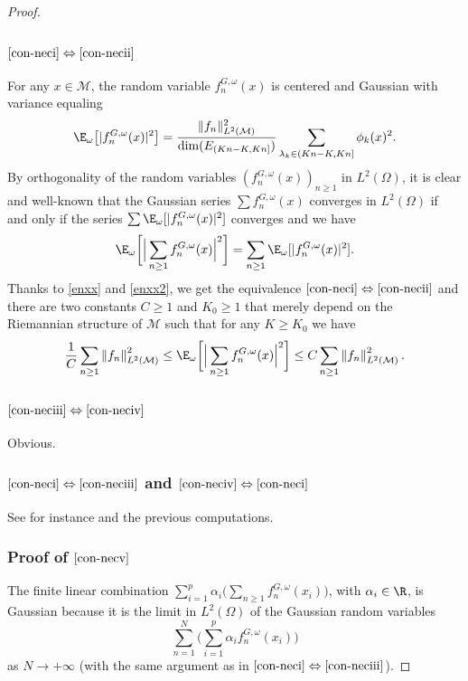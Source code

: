 \skpt
\begin{proof}\vspace*{-5pt}
\subsubsection*{$\eqref{con-neci}\Leftrightarrow\eqref{con-necii}$}
For any $x\in \mathcal{M}$, the random variable $f_n^{G,\omega}(x)$ is centered and Gaussian with
variance equaling
\begin{equation*}
\E_{\omega}\bigl[|f_n^{G,\omega}(x)|^2\bigr]=\frac{\|f_n\|_{L^2(\mathcal{M})}^2}{\dim(E_{(Kn-K,Kn]})}\sum_{\lambda_k\in (Kn-K,Kn]} \phi_k(x)^2.
\end{equation*}
By orthogonality of the random variables $(f_n^{G,\omega}(x))_{n\geq 1}$ in $L^2(\Omega)$, it is clear and well-known that the Gaussian series $\sum f_n^{G,\omega}(x)$ converges in $L^2(\Omega)$ if and only if the series $\sum \E_{\omega}[|f_n^{G,\omega}(x)|^2]$ converges and we have
\begin{equation*}
\E_{\omega}\biggl[\Big| \sum_{n\geq 1}f_n^{G,\omega}(x) \Big|^2 \biggr]=\sum_{n\geq 1} \E_{\omega}[|f_n^{G,\omega}(x)|^2].
\end{equation*}
Thanks to \eqref{enxx} and \eqref{enxx2}, we get the equivalence $\eqref{con-neci}\Leftrightarrow\eqref{con-necii}$ and
there are two constants $C\geq 1$ and $K_0\geq 1$ that merely depend on the Riemannian structure of $\mathcal{M}$ such that for any $K\geq K_0$ we have
\begin{equation}\label{gaau2}
\frac{1}{C}\sum_{n\geq 1} \left\Vert f_n\right\Vert_{L^2(\mathcal{M})}^2\leq \E_{\omega}
\biggl[\Big|\sum_{n\geq 1} f_n^{G,\omega}(x) \Big|^2 \biggr]
\leq C \sum_{n\geq 1} \left\Vert f_n\right\Vert_{L^2(\mathcal{M})}^2.
\end{equation}

\subsubsection*{$\eqref{con-neciii}\Leftrightarrow\eqref{con-neciv}$}
Obvious.

\subsubsection*{$\eqref{con-neci}\Leftrightarrow\eqref{con-neciii}$ and $\eqref{con-neciv}\Leftrightarrow\eqref{con-neci}$} See for instance \cite[Cor.\,III.6, p.\,26]{queff2} and the previous computations.

\subsubsection*{Proof of $\eqref{con-necv}$} The finite linear combination $\sum_{i=1}^{p} \alpha_i \bigl(\sum_{n\geq 1}f_n^{G,\omega}(x_i)\bigr)$, with $\alpha_i\in \R$, is Gaussian because it is the limit in $L^2(\Omega)$ of the Gaussian random variables
\begin{equation*}
\sum_{n=1}^N \biggl(\sum_{i=1}^p \alpha_i f_n^{G,\omega}(x_i) \biggr)
\end{equation*} as $N\to +\infty$ (with the same argument as in $\eqref{con-neci}\Leftrightarrow\eqref{con-neciii}$).


\end{proof}
